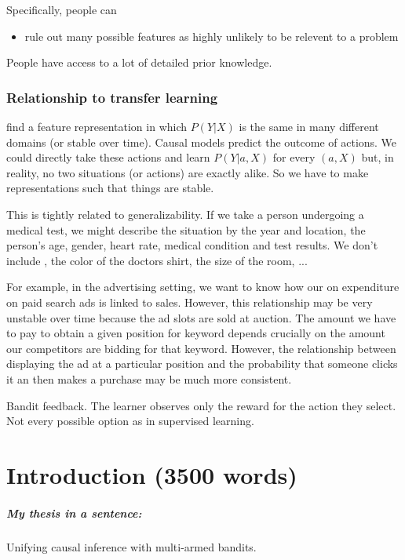\documentclass[11pt,a4paper,oneside]{book}
\begin{document}
Specifically, people can
\begin{itemize}
\item rule out many possible features as highly unlikely to be relevent to a problem
\end{itemize}

People have access to a lot of detailed prior knowledge. 

\subsection*{Relationship to transfer learning}

find a feature representation in which $P(Y|X)$ is the same in many different domains (or stable over time). Causal models predict the outcome of actions. We could directly take these actions and learn $P(Y|a,X)$ for every $(a,X)$ but, in reality, no two situations (or actions) are exactly alike. So we have to make representations such that things are stable. 

This is tightly related to generalizability. If we take a person undergoing a medical test, we might describe the situation by the year and location, the person's age, gender, heart rate, medical condition and test results. We don't include , the color of the doctors shirt, the size of the room, ...

For example, in the advertising setting, we want to know how our on expenditure on paid search ads is linked to sales. However, this relationship may be very unstable over time because the ad slots are sold at auction. The amount we have to pay to obtain a given position for keyword depends crucially on the amount our competitors are bidding for that keyword. However, the relationship between displaying the ad at a particular position and the probability that someone clicks it an then makes a purchase may be much more consistent. 

Bandit feedback. The learner observes only the reward for the action they select. Not every possible option as in supervised learning.

\chapter*{Introduction (3500 words)}

\paragraph*{My thesis in a sentence:} Unifying causal inference with multi-armed bandits.
\end{document}
